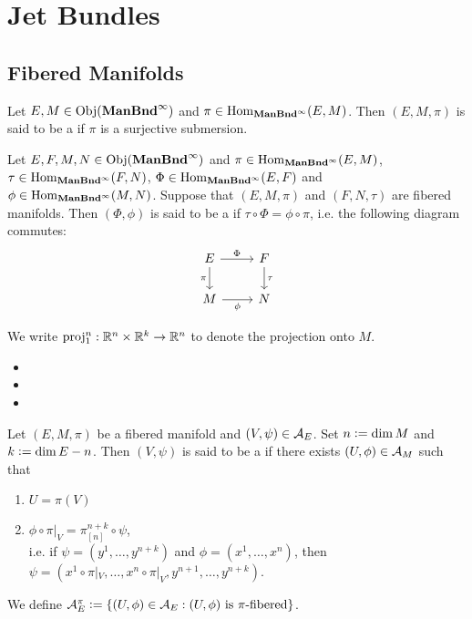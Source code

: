 \documentclass{book}
\begin{document}
\chapter{Jet Bundles}

\section{Fibered Manifolds}

\begin{defn} 
	Let $E, M \in \operatorname{Obj}(\operatorname*{\text{\textbf{ManBnd}}^{\infty}})$ and $\pi \in \operatorname{Hom}_{\operatorname*{\text{\textbf{ManBnd}}^{\infty}}}(E, M)$. Then $(E, M, \pi)$ is said to be a  if $\pi$ is a surjective submersion. 
\end{defn}

\begin{defn}
	Let $E,F, M, N \in \operatorname{Obj}(\operatorname*{\text{\textbf{ManBnd}}^{\infty}})$ and $\pi \in \operatorname{Hom}_{\operatorname*{\text{\textbf{ManBnd}}^{\infty}}}(E, M)$, $\tau \in \operatorname{Hom}_{\operatorname*{\text{\textbf{ManBnd}}^{\infty}}}(F, N)$, $\Phi \in \operatorname{Hom}_{\operatorname*{\text{\textbf{ManBnd}}^{\infty}}}(E, F)$ and $\phi \in \operatorname{Hom}_{\operatorname*{\text{\textbf{ManBnd}}^{\infty}}}(M, N)$. Suppose that $(E, M, \pi)$ and $(F, N, \tau)$ are fibered manifolds. Then $(\Phi, \phi)$ is said to be a  if $\tau \circ \Phi = \phi \circ \pi$, i.e. the following diagram commutes: \\
	\[ 
	\begin{tikzcd}
		E \arrow[d, "\pi"'] \arrow[r, "\Phi"] & F \arrow[d, "\tau"] \\
		M \arrow[r, "\phi"'] &  N
	\end{tikzcd}
	\] 
\end{defn}

\begin{note}
	We write $\operatorname{\text{proj}}^n_1: \mathbb{R}^n \times \mathbb{R}^k \rightarrow \mathbb{R}^n$ to denote the projection onto $M$.
\end{note}

\begin{itemize}
	\item {}
	\item {}
	\item {}
\end{itemize}

\begin{defn} 
	Let $(E, M, \pi)$ be a fibered manifold and $(V, \psi) \in \mathcal{A}_{E}$. Set $n \vcentcolon= \dim M$ and $k \vcentcolon= \dim E - n$. Then $(V, \psi)$ is said to be a  if there exists $(U, \phi) \in \mathcal{A}_{M}$ such that 
	\begin{enumerate}
		\item $U = \pi(V)$
		\item $\phi \circ \pi|_V = \pi^{n+k}_{[n]} \circ \psi$, \\
		i.e. if $\psi = (y^1, \ldots, y^{n+k})$ and $\phi = (x^1, \ldots, x^n)$, then $\psi = (x^1 \circ \pi|_V, \ldots, x^n \circ \pi|_V, y^{n+1}, \ldots, y^{n+k})$.
	\end{enumerate}
	We define $\mathcal{A}_E^{\pi} \vcentcolon= \{(U, \phi) \in \mathcal{A}_E: \text{$(U, \phi)$ is $\pi$-fibered} \}$.
\end{defn}
\end{document}
